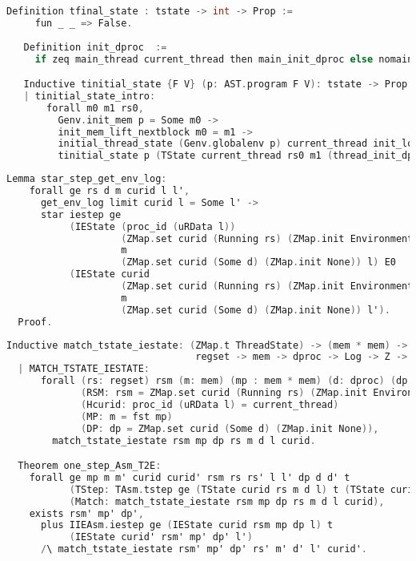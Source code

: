 \begin{lstlisting}[language=C]
   Definition tfinal_state : tstate -> int -> Prop :=
     fun _ _ => False.
   
   Definition init_dproc  :=
     if zeq main_thread current_thread then main_init_dproc else nomain_init_dproc.

   Inductive tinitial_state {F V} (p: AST.program F V): tstate -> Prop :=
   | tinitial_state_intro: 
       forall m0 m1 rs0,
         Genv.init_mem p = Some m0 ->
         init_mem_lift_nextblock m0 = m1 ->
         initial_thread_state (Genv.globalenv p) current_thread init_log = Some rs0 ->
         tinitial_state p (TState current_thread rs0 m1 (thread_init_dproc current_thread) init_log).
\end{lstlisting}

\begin{lstlisting}[language=C]
  Lemma star_step_get_env_log:
    forall ge rs d m curid l l',
      get_env_log limit curid l = Some l' ->
      star iestep ge
           (IEState (proc_id (uRData l))
                    (ZMap.set curid (Running rs) (ZMap.init Environment))
                    m
                    (ZMap.set curid (Some d) (ZMap.init None)) l) E0
           (IEState curid
                    (ZMap.set curid (Running rs) (ZMap.init Environment))
                    m
                    (ZMap.set curid (Some d) (ZMap.init None)) l').
  Proof.
\end{lstlisting}

\begin{lstlisting}[language=C]
  Inductive match_tstate_iestate: (ZMap.t ThreadState) -> (mem * mem) -> (ZMap.t (option dproc)) ->
                                 regset -> mem -> dproc -> Log -> Z -> Prop :=
  | MATCH_TSTATE_IESTATE:
      forall (rs: regset) rsm (m: mem) (mp : mem * mem) (d: dproc) (dp : ZMap.t (option dproc)) curid l
             (RSM: rsm = ZMap.set curid (Running rs) (ZMap.init Environment))
             (Hcurid: proc_id (uRData l) = current_thread)
             (MP: m = fst mp)
             (DP: dp = ZMap.set curid (Some d) (ZMap.init None)),        
        match_tstate_iestate rsm mp dp rs m d l curid.

  Theorem one_step_Asm_T2E:
    forall ge mp m m' curid curid' rsm rs rs' l l' dp d d' t
           (TStep: TAsm.tstep ge (TState curid rs m d l) t (TState curid' rs' m' d' l'))
           (Match: match_tstate_iestate rsm mp dp rs m d l curid),
    exists rsm' mp' dp',
      plus IIEAsm.iestep ge (IEState curid rsm mp dp l) t
           (IEState curid' rsm' mp' dp' l')
      /\ match_tstate_iestate rsm' mp' dp' rs' m' d' l' curid'.
\end{lstlisting}

